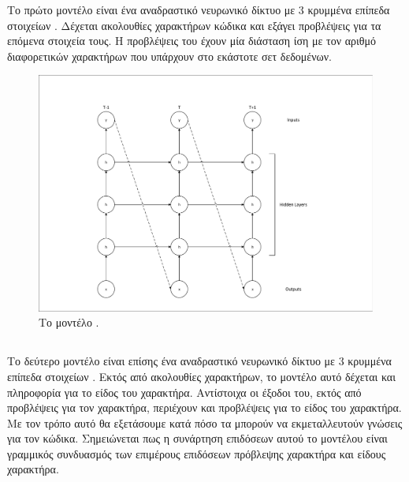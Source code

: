 Το πρώτο μοντέλο είναι ένα αναδραστικό νευρωνικό δίκτυο με 3 κρυμμένα επίπεδα στοιχείων .
Δέχεται ακολουθίες χαρακτήρων κώδικα και εξάγει προβλέψεις για τα επόμενα στοιχεία τους.
Η προβλέψεις του  έχουν μία διάσταση ίση με τον αριθμό διαφορετικών χαρακτήρων που υπάρχουν στο εκάστοτε σετ δεδομένων.   

\begin{figure}[h]
	\includegraphics[width=\textwidth, trim = 4 4 4 4, clip, keepaspectratio]{images/char-rnn.pdf}
	\centering 
	\caption{Το μοντέλο .}
	\label{fig:char-rnn}
\end{figure}

\subsection{}

Το δεύτερο μοντέλο είναι επίσης ένα αναδραστικό νευρωνικό δίκτυο με 3 κρυμμένα επίπεδα στοιχείων . 
Εκτός από ακολουθίες χαρακτήρων, το μοντέλο αυτό δέχεται και πληροφορία για το είδος του χαρακτήρα. 
Αντίστοιχα οι έξοδοι του, εκτός από προβλέψεις για τον χαρακτήρα, περιέχουν και προβλέψεις για το είδος του χαρακτήρα. Με τον τρόπο αυτό θα εξετάσουμε κατά πόσο τα  μπορούν να εκμεταλλευτούν  γνώσεις για τον κώδικα. Σημειώνεται πως η συνάρτηση επιδόσεων αυτού το μοντέλου είναι γραμμικός συνδυασμός των επιμέρους επιδόσεων πρόβλεψης χαρακτήρα και είδους χαρακτήρα.

